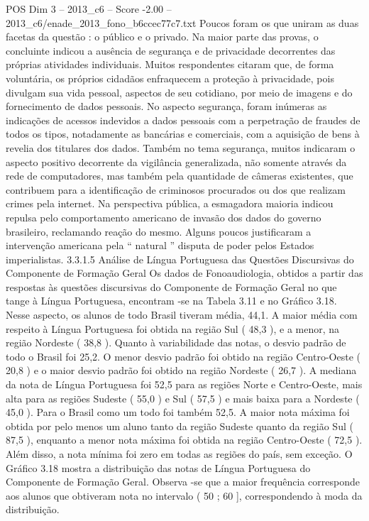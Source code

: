 \begin{textsample}{POS Dim 3 – 2013\_c6 – Score -2.00 – 2013\_c6/enade\_2013\_fono\_b6ccec77c7.txt}
Poucos foram os que uniram as duas facetas da questão : o público e o privado.
Na maior parte das provas, o concluinte indicou a ausência de segurança e de privacidade decorrentes das próprias atividades individuais.
Muitos respondentes citaram que, de forma voluntária, os próprios cidadãos enfraquecem a proteção à privacidade, pois divulgam sua vida pessoal, aspectos de seu cotidiano, por meio de imagens e do fornecimento de dados pessoais.
No aspecto segurança, foram inúmeras as indicações de acessos indevidos a dados pessoais com a perpetração de fraudes de todos os tipos, notadamente as bancárias e comerciais, com a aquisição de bens à revelia dos titulares dos dados.
Também no tema segurança, muitos indicaram o aspecto positivo decorrente da vigilância generalizada, não somente através da rede de computadores, mas também pela quantidade de câmeras existentes, que contribuem para a identificação de criminosos procurados ou dos que realizam crimes pela internet.
Na perspectiva pública, a esmagadora maioria indicou repulsa pelo comportamento americano de invasão dos dados do governo brasileiro, reclamando reação do mesmo.
Alguns poucos justificaram a intervenção americana pela “ natural ” disputa de poder pelos Estados imperialistas. 3.3.1.5 Análise de Língua Portuguesa das Questões Discursivas do Componente de Formação Geral Os dados de Fonoaudiologia, obtidos a partir das respostas às questões discursivas do Componente de Formação Geral no que tange à Língua Portuguesa, encontram -se na Tabela 3.11 e no Gráfico 3.18.
Nesse aspecto, os alunos de todo Brasil tiveram média, 44,1.
A maior média com respeito à Língua Portuguesa foi obtida na região Sul ( 48,3 ), e a menor, na região Nordeste ( 38,8 ).
Quanto à variabilidade das notas, o desvio padrão de todo o Brasil foi 25,2.
O menor desvio padrão foi obtido na região Centro-Oeste ( 20,8 ) e o maior desvio padrão foi obtido na região Nordeste ( 26,7 ).
A mediana da nota de Língua Portuguesa foi 52,5 para as regiões Norte e Centro-Oeste, mais alta para as regiões Sudeste ( 55,0 ) e Sul ( 57,5 ) e mais baixa para a Nordeste ( 45,0 ).
Para o Brasil como um todo foi também 52,5.
A maior nota máxima foi obtida por pelo menos um aluno tanto da região Sudeste quanto da região Sul ( 87,5 ), enquanto a menor nota máxima foi obtida na região Centro-Oeste ( 72,5 ).
Além disso, a nota mínima foi zero em todas as regiões do país, sem exceção.
O Gráfico 3.18 mostra a distribuição das notas de Língua Portuguesa do Componente de Formação Geral.
Observa -se que a maior frequência corresponde aos alunos que obtiveram nota no intervalo ( 50 ; 60 ], correspondendo à moda da distribuição.

\end{textsample}
